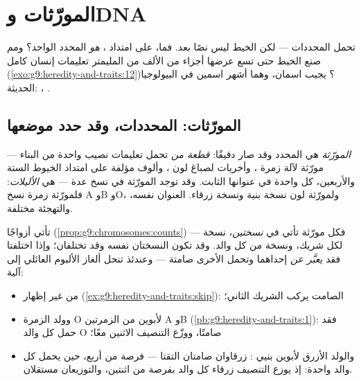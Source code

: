 \chapter{المورّثات وDNA}\label{ch:g9:genes-and-dna}

 تحمل المحددات --- لكن الخيط ليس نصًا بعد. فما،
على امتداد ، \emph{هو} المحدد الواحد؟ ومم صنع
الخيط حتى تسع  عرضها أجزاء من الألف من المليمتر
تعليمات إنسان كامل
(\cref{exo:g9:heredity-and-traits:12})؟ يجيب اسمان،
وهما أشهر اسمين في البيولوجيا الحديثة: ، .

\section{المورّثات: المحددات، وقد حدد موضعها}

\begin{definition}\label{def:g9:genes-and-dna:gene}
\emph{المورّثة} هي المحدد وقد صار دقيقًا:
\emph{قطعة من } تحمل تعليمات نصيب  واحدة من
البناء --- مورّثة لآلة زمرة ، وأخريات لصباغ لون
، وألوف مؤلفة على امتداد الخيوط الستة والأربعين،
كل واحدة في عنوانها الثابت. وقد توجد المورّثة في نسخ
عدة --- هي \emph{الأليلات}: فلمورّثة زمرة
 نسخ A وB وO، ولمورّثة لون  نسخة بنية ونسخة
زرقاء. العنوان نفسه، والتهجئة مختلفة.
\end{definition}

\begin{proposition}\label{prop:g9:genes-and-dna:twocopies}
 تأتي أزواجًا
(\cref{prop:g9:chromosomes:counts}) --- فكل مورّثة تأتي
في \emph{نسختين}، نسخة لكل شريك، ونسخة من كل والد. وقد
تكون النسختان  نفسه وقد تختلفان؛ وإذا اختلفتا فقد
\emph{يعبَّر عن} إحداهما وتحمل الأخرى صامتة --- وعندئذ
تنحل ألغاز الألبوم العائلي إلى آلية:
\begin{itemize}
  \item {} من غير إظهار
        (\cref{ex:g9:heredity-and-traits:skip}): 
        الصامت يركب الشريك الثاني؛
  \item وولد الزمرة O لأبوين من الزمرتين A وB
        (\cref{pb:g9:heredity-and-traits:1}): فقد حمل كل
        والد O صامتًا، ووزّع التنصيف الاثنين معًا؛
  \item والولد الأزرق  لأبوين بنيي :
        زرقاوان صامتان التقتا --- فرصة من أربع، حين يحمل
        كل والد واحدة: إذ يوزع التنصيف زرقاء كل والد
        بفرصة من اثنتين، والتوزيعان مستقلان.
\end{itemize}
\end{proposition}
\admitted

